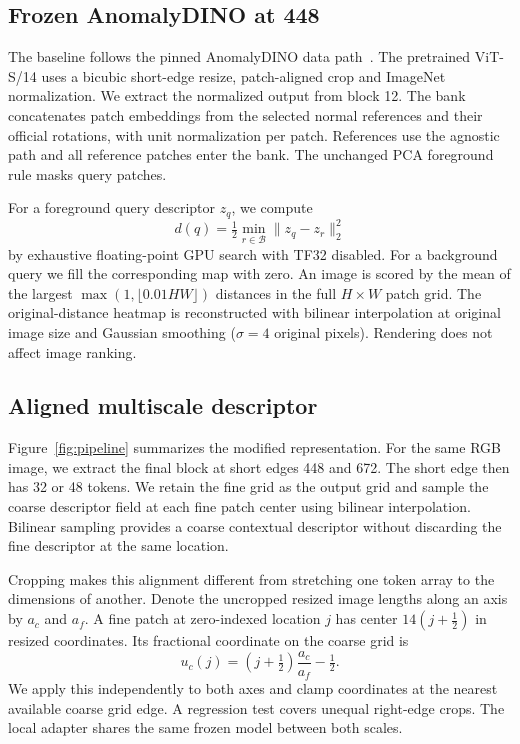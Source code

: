 \documentclass[10pt,twocolumn,letterpaper]{article}
\begin{document}
\subsection{Frozen AnomalyDINO at 448}
The baseline follows the pinned AnomalyDINO data path~\cite{damm2025anomalydino}. The pretrained ViT-S/14 uses a bicubic short-edge resize, patch-aligned crop and ImageNet normalization. We extract the normalized output from block 12. The bank concatenates patch embeddings from the selected normal references and their official rotations, with unit normalization per patch. References use the agnostic path and all reference patches enter the bank. The unchanged PCA foreground rule masks query patches.

For a foreground query descriptor \(z_q\), we compute
\[
 d(q)=\tfrac12\min_{r\in\mathcal B}\|z_q-z_r\|_2^2
\]
by exhaustive floating-point GPU search with TF32 disabled. For a background query we fill the corresponding map with zero. An image is scored by the mean of the largest \(\max(1,\lfloor 0.01 HW\rfloor)\) distances in the full \(H\times W\) patch grid. The original-distance heatmap is reconstructed with bilinear interpolation at original image size and Gaussian smoothing (\(\sigma=4\) original pixels). Rendering does not affect image ranking.

\subsection{Aligned multiscale descriptor}
Figure~\ref{fig:pipeline} summarizes the modified representation. For the same RGB image, we extract the final block at short edges 448 and 672. The short edge then has 32 or 48 tokens. We retain the fine grid as the output grid and sample the coarse descriptor field at each fine patch center using bilinear interpolation. Bilinear sampling provides a coarse contextual descriptor without discarding the fine descriptor at the same location.

Cropping makes this alignment different from stretching one token array to the dimensions of another. Denote the uncropped resized image lengths along an axis by \(a_c\) and \(a_f\). A fine patch at zero-indexed location \(j\) has center \(14(j+\frac12)\) in resized coordinates. Its fractional coordinate on the coarse grid is
\[
 u_c(j)=(j+\tfrac12)\frac{a_c}{a_f}-\tfrac12 .
\]
We apply this independently to both axes and clamp coordinates at the nearest available coarse grid edge. A regression test covers unequal right-edge crops. The local adapter shares the same frozen model between both scales.
\end{document}
